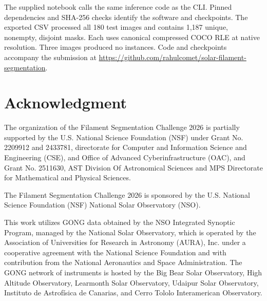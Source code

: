 \documentclass[sigconf]{acmart}
\begin{document}
The supplied notebook calls the same inference code as the CLI. Pinned dependencies and SHA-256 checks identify the software and checkpoints. The exported CSV processed all 180 test images and contains 1,187 unique, nonempty, disjoint masks. Each uses canonical compressed COCO RLE at native resolution. Three images produced no instances. Code and checkpoints accompany the submission at \url{https://github.com/rahulcomet/solar-filament-segmentation}.

\clearpage
\section{Acknowledgment}
The organization of the Filament Segmentation Challenge 2026 is partially supported by the U.S. National Science Foundation (NSF) under Grant No. 2209912 and 2433781, directorate for Computer and Information Science and Engineering (CSE), and Office of Advanced Cyberinfrastructure (OAC), and Grant No. 2511630, AST Division Of Astronomical Sciences and MPS Directorate for Mathematical and Physical Sciences.

The Filament Segmentation Challenge 2026 is sponsored by the U.S. National Science Foundation (NSF) National Solar Observatory (NSO).

This work utilizes GONG data obtained by the NSO Integrated Synoptic Program, managed by the National Solar Observatory, which is operated by the Association of Universities for Research in Astronomy (AURA), Inc. under a cooperative agreement with the National Science Foundation and with contribution from the National Aeronautics and Space Administration. The GONG network of instruments is hosted by the Big Bear Solar Observatory, High Altitude Observatory, Learmonth Solar Observatory, Udaipur Solar Observatory, Instituto de Astrof\'isica de Canarias, and Cerro Tololo Interamerican Observatory.



\end{document}
